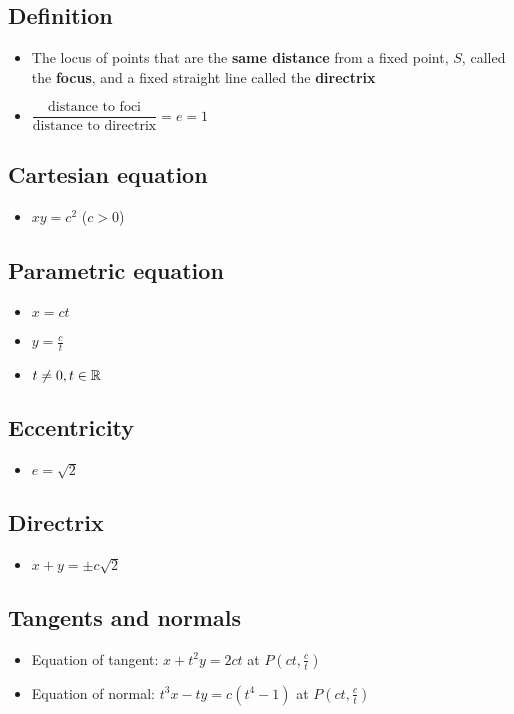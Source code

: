 \subsection{Definition}
\begin{itemize}
    \item The locus of points that are the \textbf{same distance} from a fixed point, $S$,
          called the \textbf{focus}, and a fixed straight line called the \textbf{directrix}
    \item $\dfrac{\text{distance to foci}}{\text{distance to directrix}} = e = 1$
\end{itemize}
\subsection{Cartesian equation}
\begin{itemize}
    \item $xy=c^2$ ($c>0$)
\end{itemize}
\subsection{Parametric equation}
\begin{itemize}
    \item $x=ct$
    \item $y=\frac{c}{t}$
    \item $t \neq 0, t\in\operatorname{\mathbb{R}}$
\end{itemize}
\subsection{Eccentricity}
\begin{itemize}
    \item $e=\sqrt{2}$
\end{itemize}
\subsection{Directrix}
\begin{itemize}
    \item $x+y=\pm c\sqrt{2}$
\end{itemize}
\subsection{Tangents and normals}
\begin{itemize}
    \item Equation of tangent: $x+t^2y=2ct$ at $P(ct, \frac{c}{t})$
    \item Equation of normal: $t^3x-ty=c(t^4-1)$ at $P(ct, \frac{c}{t})$
\end{itemize}